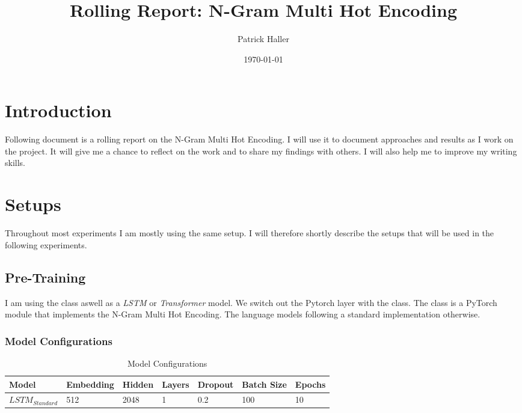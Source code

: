 \documentclass[11pt]{article}
\title{Rolling Report: N-Gram Multi Hot Encoding}
\author{ Patrick Haller }
\date{\today}
\begin{document}
\maketitle	



\section{Introduction}

Following document is a rolling report on the N-Gram Multi Hot Encoding. I will use it
to document approaches and results as I work on the project. It will give me a
chance to reflect on the work and to share my findings with others. I will also help me
to improve my writing skills.

\section{Setups}
Throughout most experiments I am mostly using the same setup. I will therefore shortly
describe the setups that will be used in the following experiments.

\subsection{Pre-Training}

I am using the 
class aswell as a \textit{LSTM} or \textit{Transformer} model. We switch out the Pytorch 
layer with the  class. 
The  class is a PyTorch module that implements the N-Gram Multi Hot Encoding.
The language models following a standard implementation otherwise.

\subsubsection{Model Configurations}

\begin{table}
\centering
\begin{tabular}{|l|l|l|l|l|l|l|}
\hline
Model & Embedding & Hidden & Layers & Dropout & Batch Size & Epochs \\ \hline
$LSTM_{Standard}$ & 512 & 2048 & 1 & 0.2 & 100 & 10 \\ \hline
\end{tabular}
\caption{Model Configurations}
\label{tab:model-configurations}
\end{table}
\end{document}
